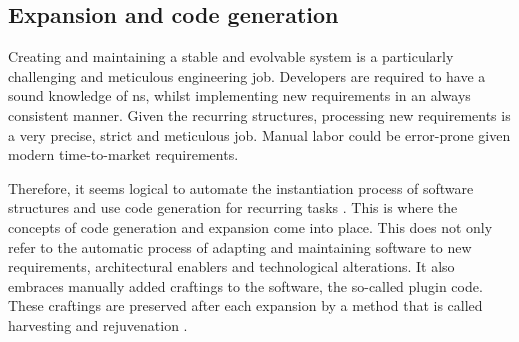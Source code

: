 \subsection{Expansion and code generation} \label{subsec_expansion}

Creating and maintaining a stable and evolvable system is a particularly challenging and
meticulous engineering job. Developers are required to have a sound knowledge of \gls{ns},
whilst implementing new requirements in an always consistent manner. Given the recurring
structures, processing new requirements is a very precise, strict and meticulous job.
\parencite[403]{mannaert_normalized_2016} Manual labor could be error-prone given modern
time-to-market requirements. 

Therefore, it seems logical to automate the instantiation process of software structures
and use code generation for recurring tasks \parencite[403]{mannaert_normalized_2016}.
This is where the concepts of code generation and expansion come into place. This does not
only refer to the automatic process of adapting and maintaining software to new
requirements, architectural enablers and technological alterations. It also embraces
manually added craftings to the software, the so-called plugin code. These craftings are
preserved after each expansion by a method that is called harvesting and rejuvenation
\parencite[405-406]{mannaert_normalized_2016}.

